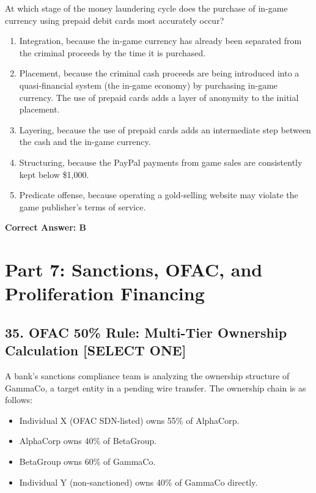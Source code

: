 \documentclass[11pt,a4paper]{article}
\begin{document}
	At which stage of the money laundering cycle does the purchase of in-game currency using prepaid debit cards most accurately occur?
	
	\begin{enumerate}[label=\Alph*.]
		\item Integration, because the in-game currency has already been separated from the criminal proceeds by the time it is purchased.
		\item Placement, because the criminal cash proceeds are being introduced into a quasi-financial system (the in-game economy) by purchasing in-game currency. The use of prepaid cards adds a layer of anonymity to the initial placement.
		\item Layering, because the use of prepaid cards adds an intermediate step between the cash and the in-game currency.
		\item Structuring, because the PayPal payments from game sales are consistently kept below \$1,000.
		\item Predicate offense, because operating a gold-selling website may violate the game publisher's terms of service.
	\end{enumerate}
	\textbf{Correct Answer: B}
	
	\section{Part 7: Sanctions, OFAC, and Proliferation Financing}
	
	\subsection{35. OFAC 50\% Rule: Multi-Tier Ownership Calculation \textnormal{[SELECT ONE]}}
	
	A bank's sanctions compliance team is analyzing the ownership structure of GammaCo, a target entity in a pending wire transfer. The ownership chain is as follows:
	
	\begin{itemize}
		\item Individual X (OFAC SDN-listed) owns 55\% of AlphaCorp.
		\item AlphaCorp owns 40\% of BetaGroup.
		\item BetaGroup owns 60\% of GammaCo.
		\item Individual Y (non-sanctioned) owns 40\% of GammaCo directly.
	\end{itemize}
	
\end{document}
